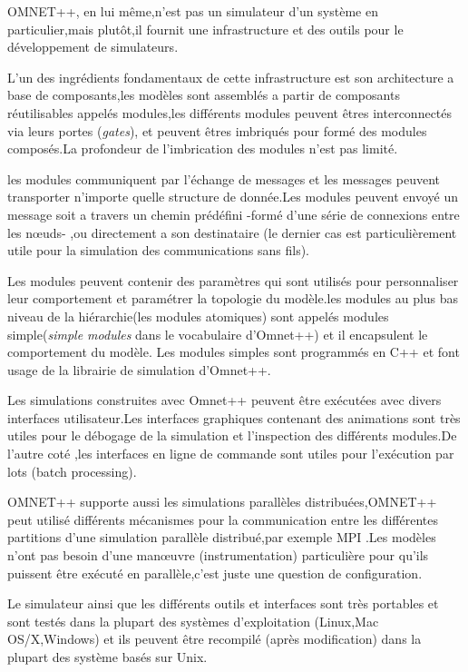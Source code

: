 OMNET++, en lui même,n'est pas un simulateur d'un système en particulier,mais plutôt,il fournit une infrastructure et des outils pour le développement de simulateurs.

L'un des ingrédients fondamentaux de cette infrastructure est son architecture a base de composants,les modèles sont assemblés a partir de composants réutilisables appelés modules,les différents modules peuvent êtres interconnectés via leurs portes (\emph{gates}), et peuvent êtres imbriqués pour formé des modules composés.La profondeur de l'imbrication des modules n'est pas limité.

les modules communiquent par l'échange de messages et les messages peuvent transporter n'importe quelle structure de donnée.Les modules peuvent envoyé un message soit a travers un chemin prédéfini -formé d'une série de connexions entre les nœuds- ,ou directement a son destinataire (le dernier cas est particulièrement utile pour la simulation des communications sans fils).

Les modules peuvent contenir des paramètres qui sont utilisés pour personnaliser leur comportement et paramétrer la topologie du modèle.les modules au plus bas niveau de la hiérarchie(les modules atomiques) sont appelés modules simple(\emph{simple modules} dans le vocabulaire d'Omnet++) et il encapsulent le comportement du modèle. Les modules simples sont programmés en C++ et font usage de la librairie de simulation d'Omnet++.

Les simulations construites avec Omnet++ peuvent être exécutées avec divers interfaces utilisateur.Les interfaces graphiques contenant des animations sont très utiles pour le débogage de la simulation et l'inspection des différents modules.De l'autre coté ,les interfaces en ligne de commande sont utiles pour l'exécution par lots (batch processing).

OMNET++ supporte aussi les simulations parallèles distribuées,OMNET++ peut utilisé différents mécanismes pour la communication entre les différentes partitions d'une simulation parallèle distribué,par exemple MPI .Les modèles n'ont pas besoin d'une manœuvre (instrumentation) particulière  pour qu'ils puissent être exécuté en parallèle,c'est juste une question de configuration.
 
Le simulateur ainsi que les différents outils et interfaces sont très portables et sont testés dans la plupart des systèmes  d'exploitation (Linux,Mac OS/X,Windows) et ils peuvent être recompilé (après modification) dans la plupart des système basés sur Unix.


